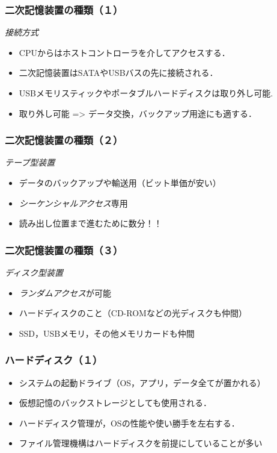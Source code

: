 \documentclass{beamer}                   %
\begin{document}
\begin{frame}
  \frametitle{二次記憶装置の種類（１）}
  \emph{接続方式}
  \begin{itemize}
  \item CPUからはホストコントローラを介してアクセスする．
  \item 二次記憶装置はSATAやUSBバスの先に接続される．
  \item USBメモリスティックやポータブルハードディスクは取り外し可能.
  \item 取り外し可能 => データ交換，バックアップ用途にも適する．
  \end{itemize}
\end{frame}

\begin{frame}
  \frametitle{二次記憶装置の種類（２）}
  \emph{テープ型装置}
  \begin{itemize}
  \item データのバックアップや輸送用（ビット単価が安い）
  \item \emph{シーケンシャルアクセス}専用
  \item 読み出し位置まで進むために数分！！
  \end{itemize}
\end{frame}

\begin{frame}
  \frametitle{二次記憶装置の種類（３）}
  \emph{ディスク型装置}
  \begin{itemize}
  \item \emph{ランダムアクセス}が可能
  \item ハードディスクのこと（CD-ROMなどの光ディスクも仲間）
  \item SSD，USBメモリ，その他メモリカードも仲間
  \end{itemize}
\end{frame}

\begin{frame}
  \frametitle{ハードディスク（１）}
  \begin{itemize}
  \item システムの起動ドライブ（OS，アプリ，データ全てが置かれる）
  \item 仮想記憶のバックストレージとしても使用される．
  \item ハードディスク管理が，OSの性能や使い勝手を左右する．
  \item ファイル管理機構はハードディスクを前提にしていることが多い
  \end{itemize}
\end{frame}
\end{document}

